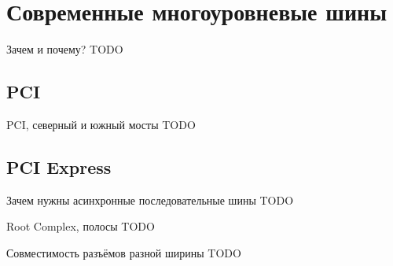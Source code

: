 \documentclass[xetex,aspectratio=43]{beamer}
\begin{document}
\section{Современные многоуровневые шины}

\begin{frame}{Зачем и почему?}
	TODO
\end{frame}

\subsection{PCI}

\begin{frame}{PCI, северный и южный мосты}
	TODO
\end{frame}

\subsection{PCI Express}

\begin{frame}{Зачем нужны асинхронные последовательные шины}
	TODO
\end{frame}

\begin{frame}{Root Complex, полосы}
	TODO
\end{frame}

\begin{frame}{Совместимость разъёмов разной ширины}
	TODO
\end{frame}


\section*{}
\end{document}
